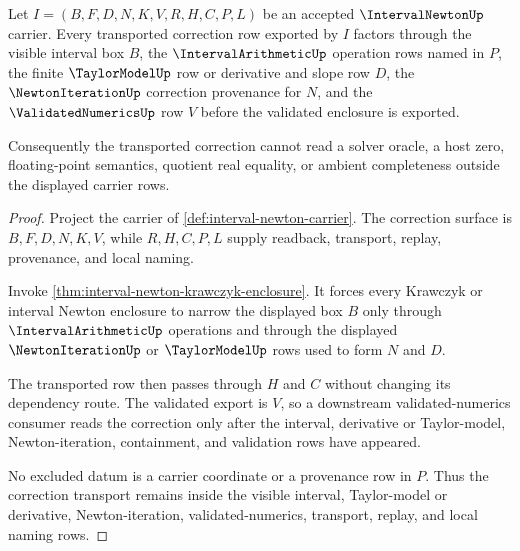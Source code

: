 \begin{theorem}
\label{thm:interval-newton-correction-transport-scope}
Let $I=(B,F,D,N,K,V,R,H,C,P,L)$ be an accepted $\IntervalNewtonUp$ carrier. Every transported correction row exported by $I$ factors through the visible interval box $B$, the $\IntervalArithmeticUp$ operation rows named in $P$, the finite $\TaylorModelUp$ row or derivative and slope row $D$, the $\NewtonIterationUp$ correction provenance for $N$, and the $\ValidatedNumericsUp$ row $V$ before the validated enclosure is exported.

Consequently the transported correction cannot read a solver oracle, a host zero, floating-point semantics, quotient real equality, or ambient completeness outside the displayed carrier rows.
\end{theorem}
\begin{proof}
Project the carrier of \autoref{def:interval-newton-carrier}. The correction surface is $B,F,D,N,K,V$, while $R,H,C,P,L$ supply readback, transport, replay, provenance, and local naming.

Invoke \autoref{thm:interval-newton-krawczyk-enclosure}. It forces every Krawczyk or interval Newton enclosure to narrow the displayed box $B$ only through $\IntervalArithmeticUp$ operations and through the displayed $\NewtonIterationUp$ or $\TaylorModelUp$ rows used to form $N$ and $D$.

The transported row then passes through $H$ and $C$ without changing its dependency route. The validated export is $V$, so a downstream validated-numerics consumer reads the correction only after the interval, derivative or Taylor-model, Newton-iteration, containment, and validation rows have appeared.

No excluded datum is a carrier coordinate or a provenance row in $P$. Thus the correction transport remains inside the visible interval, Taylor-model or derivative, Newton-iteration, validated-numerics, transport, replay, and local naming rows.
\end{proof}

